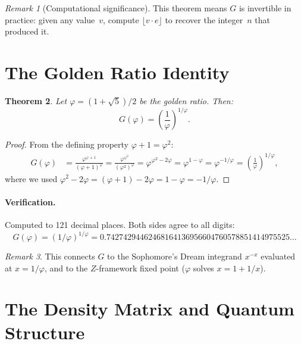 \documentclass[11pt,a4paper]{article}
\newtheorem{theorem}{Theorem}[section]
\theoremstyle{definition}
\theoremstyle{remark}
\newtheorem{remark}[theorem]{Remark}
\newcommand{\floor}[1]{\lfloor #1 \rfloor}
\begin{document}
\begin{remark}[Computational significance]\label{rem:invert}
This theorem means $G$ is invertible in practice: given any value~$v$, compute $\floor{v\cdot e}$ to recover the integer~$n$ that produced it.
\end{remark}

\section{The Golden Ratio Identity}\label{sec:golden}

\begin{theorem}\label{thm:golden}
Let $\varphi = (1+\sqrt{5})/2$ be the golden ratio. Then:
\begin{equation}\label{eq:golden}
  G(\varphi) = \left(\frac{1}{\varphi}\right)^{1/\varphi}.
\end{equation}
\end{theorem}

\begin{proof}
From the defining property $\varphi+1=\varphi^{2}$:
\begin{align*}
  G(\varphi) &= \frac{\varphi^{\varphi+1}}{(\varphi+1)^{\varphi}} = \frac{\varphi^{\varphi^{2}}}{(\varphi^{2})^{\varphi}} = \varphi^{\varphi^{2}-2\varphi} = \varphi^{1-\varphi} = \varphi^{-1/\varphi} = \left(\frac{1}{\varphi}\right)^{1/\varphi},
\end{align*}
where we used $\varphi^{2}-2\varphi = (\varphi+1)-2\varphi = 1-\varphi = -1/\varphi$.
\end{proof}

\paragraph{Verification.}
Computed to 121 decimal places. Both sides agree to all digits:
\[
  G(\varphi) = (1/\varphi)^{1/\varphi} = 0.74274294462468164136956604760578851414975525\ldots
\]

\begin{remark}\label{rem:sophomore}
This connects $G$ to the Sophomore's Dream integrand $x^{-x}$ evaluated at $x=1/\varphi$, and to the $Z$-framework fixed point ($\varphi$ solves $x = 1 + 1/x$).
\end{remark}

\section{The Density Matrix and Quantum Structure}\label{sec:density}
\end{document}
